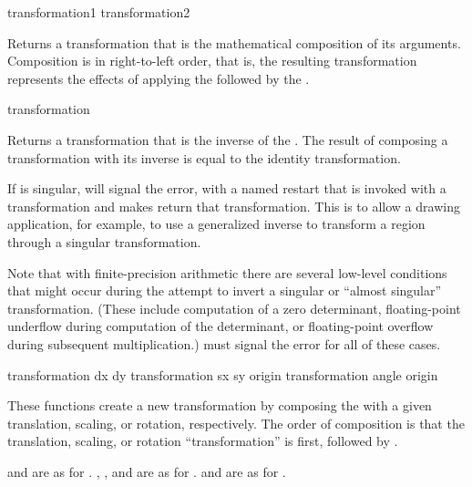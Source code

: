  {transformation1 transformation2}

Returns a transformation that is the mathematical composition of its arguments.
Composition is in right-to-left order, that is, the resulting transformation
represents the effects of applying the 
 followed by the 
.

 {transformation}

Returns a transformation that is the inverse of the 
.  The result of composing a transformation with its inverse
is equal to the identity transformation.

If  is singular,  will signal the
 error, with a named restart that is invoked with a
transformation and makes  return that transformation.
This is to allow a drawing application, for example, to use a generalized
inverse to transform a region through a singular transformation.

Note that with finite-precision arithmetic there are several low-level
conditions that might occur during the attempt to invert a singular or ``almost
singular'' transformation.  (These include computation of a zero determinant,
floating-point underflow during computation of the determinant, or
floating-point overflow during subsequent multiplication.)
 must signal the  error
for all of these cases.

 {transformation dx dy}
     {transformation sx sy \optional origin}
    {transformation angle \optional origin} 

These functions create a new transformation by composing the
  with a given translation, scaling, or
rotation, respectively.  The order of composition is that the translation,
scaling, or rotation ``transformation'' is first, followed by
.

 and  are as for .
, , and  are as for .
 and  are as for .

